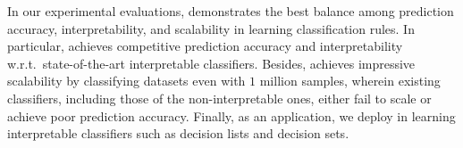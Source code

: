 In our experimental evaluations, {\imli} demonstrates the best balance among prediction accuracy, interpretability, and scalability in learning classification rules. In particular, {\imli} achieves competitive prediction accuracy and interpretability w.r.t.\ state-of-the-art interpretable classifiers. Besides, {\imli} achieves impressive scalability by classifying datasets even with $ 1 $ million samples, wherein existing classifiers, including those of the non-interpretable ones, either fail to scale or achieve poor prediction accuracy. Finally, as an application, we deploy {\imli} in learning interpretable classifiers such as decision lists and decision sets.













